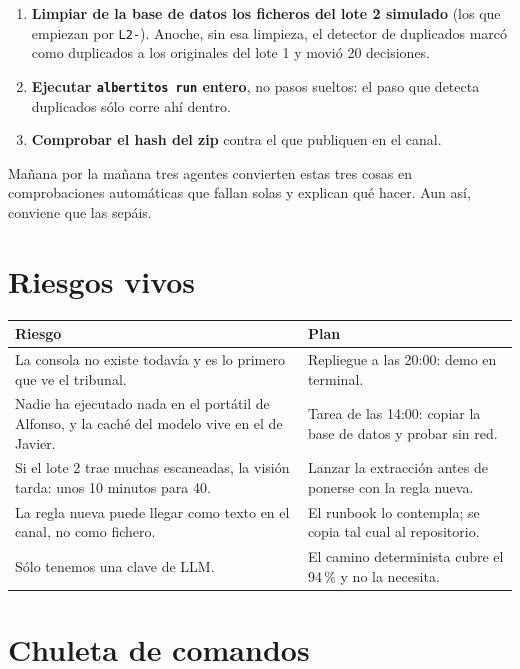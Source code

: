 \documentclass[11pt,a4paper]{article}
\newcommand{\cmd}[1]{\texttt{\small #1}}
\begin{document}
\begin{enumerate}
  \item \textbf{Limpiar de la base de datos los ficheros del lote 2 simulado} (los que empiezan por
        \cmd{L2-}). Anoche, sin esa limpieza, el detector de duplicados marcó como duplicados a los
        originales del lote 1 y movió 20 decisiones.
  \item \textbf{Ejecutar \cmd{albertitos run} entero}, no pasos sueltos: el paso que detecta duplicados sólo
        corre ahí dentro.
  \item \textbf{Comprobar el hash del zip} contra el que publiquen en el canal.
\end{enumerate}

\noindent Mañana por la mañana tres agentes convierten estas tres cosas en comprobaciones automáticas que
fallan solas y explican qué hacer. Aun así, conviene que las sepáis.

\section{Riesgos vivos}

\begin{center}
\begin{tabularx}{\linewidth}{Xl}
\toprule
\textbf{Riesgo} & \textbf{Plan} \\
\midrule
La consola no existe todavía y es lo primero que ve el tribunal. & Repliegue a las 20:00: demo en terminal. \\
Nadie ha ejecutado nada en el portátil de Alfonso, y la caché del modelo vive en el de Javier. & Tarea de las 14:00: copiar la base de datos y probar sin red. \\
Si el lote 2 trae muchas escaneadas, la visión tarda: unos 10 minutos para 40. & Lanzar la extracción antes de ponerse con la regla nueva. \\
La regla nueva puede llegar como texto en el canal, no como fichero. & El runbook lo contempla; se copia tal cual al repositorio. \\
Sólo tenemos una clave de LLM. & El camino determinista cubre el 94\,\% y no la necesita. \\
\bottomrule
\end{tabularx}
\end{center}

\section{Chuleta de comandos}
\end{document}
